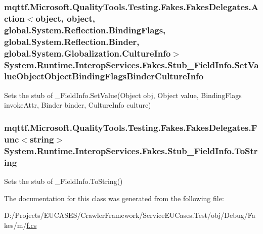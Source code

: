 \hypertarget{class_system_1_1_runtime_1_1_interop_services_1_1_fakes_1_1_stub___field_info_a8651b26e17600f7aeb5851e73ada18a5}{
\subsubsection[{Set\-Value\-Object\-Object\-Binding\-Flags\-Binder\-Culture\-Info}]{\setlength{\rightskip}{0pt plus 5cm}mqttf.\-Microsoft.\-Quality\-Tools.\-Testing.\-Fakes.\-Fakes\-Delegates.\-Action$<$object, object, global.\-System.\-Reflection.\-Binding\-Flags, global.\-System.\-Reflection.\-Binder, global.\-System.\-Globalization.\-Culture\-Info$>$ System.\-Runtime.\-Interop\-Services.\-Fakes.\-Stub\-\_\-\-Field\-Info.\-Set\-Value\-Object\-Object\-Binding\-Flags\-Binder\-Culture\-Info}}\label{class_system_1_1_runtime_1_1_interop_services_1_1_fakes_1_1_stub___field_info_a8651b26e17600f7aeb5851e73ada18a5}


Sets the stub of \-\_\-\-Field\-Info.\-Set\-Value(\-Object obj, Object value, Binding\-Flags invoke\-Attr, Binder binder, Culture\-Info culture)

\hypertarget{class_system_1_1_runtime_1_1_interop_services_1_1_fakes_1_1_stub___field_info_a79ea15a0c29a97795a9f46f5ec2cff88}{
\subsubsection[{To\-String}]{\setlength{\rightskip}{0pt plus 5cm}mqttf.\-Microsoft.\-Quality\-Tools.\-Testing.\-Fakes.\-Fakes\-Delegates.\-Func$<$string$>$ System.\-Runtime.\-Interop\-Services.\-Fakes.\-Stub\-\_\-\-Field\-Info.\-To\-String}}\label{class_system_1_1_runtime_1_1_interop_services_1_1_fakes_1_1_stub___field_info_a79ea15a0c29a97795a9f46f5ec2cff88}


Sets the stub of \-\_\-\-Field\-Info.\-To\-String()



The documentation for this class was generated from the following file\-:\begin{DoxyCompactItemize}
\item 
D\-:/\-Projects/\-E\-U\-C\-A\-S\-E\-S/\-Crawler\-Framework/\-Service\-E\-U\-Cases.\-Test/obj/\-Debug/\-Fakes/m/\hyperlink{m_2f_8cs}{f.\-cs}\end{DoxyCompactItemize}
